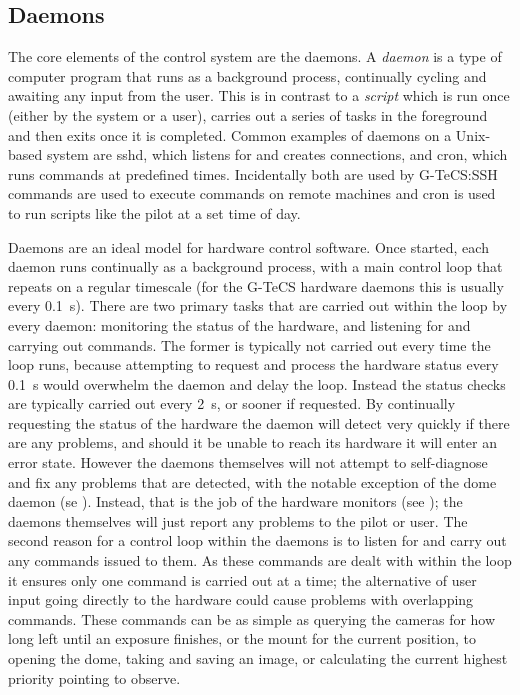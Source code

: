 
\subsection{Daemons}
\label{sec:daemons}
\begin{colsection}

The core elements of the control system are the daemons. A \emph{daemon} is a type of computer program that runs as a background process, continually cycling and awaiting any input from the user. This is in contrast to a \emph{script} which is run once (either by the system or a user), carries out a series of tasks in the foreground and then exits once it is completed. Common examples of daemons on a Unix-based system are sshd, which listens for and creates  connections, and cron, which runs commands at predefined times. Incidentally both are used by G-TeCS:\@ SSH commands are used to execute commands on remote machines and cron is used to run scripts like the pilot at a set time of day.

Daemons are an ideal model for hardware control software. Once started, each daemon runs continually as a background process, with a main control loop that repeats on a regular timescale (for the G-TeCS hardware daemons this is usually every \SI{0.1}{\second}). There are two primary tasks that are carried out within the loop by every daemon: monitoring the status of the hardware, and listening for and carrying out commands. The former is typically not carried out every time the loop runs, because attempting to request and process the hardware status every \SI{0.1}{\second} would overwhelm the daemon and delay the loop. Instead the status checks are typically carried out every \SI{2}{\second}, or sooner if requested. By continually requesting the status of the hardware the daemon will detect very quickly if there are any problems, and should it be unable to reach its hardware it will enter an error state. However the daemons themselves will not attempt to self-diagnose and fix any problems that are detected, with the notable exception of the dome daemon (se ). Instead, that is the job of the hardware monitors (see ); the daemons themselves will just report any problems to the pilot or user. The second reason for a control loop within the daemons is to listen for and carry out any commands issued to them. As these commands are dealt with within the loop it ensures only one command is carried out at a time; the alternative of user input going directly to the hardware could cause problems with overlapping commands. These commands can be as simple as querying the cameras for how long left until an exposure finishes, or the mount for the current position, to opening the dome, taking and saving an image, or calculating the current highest priority pointing to observe.


\end{colsection}
